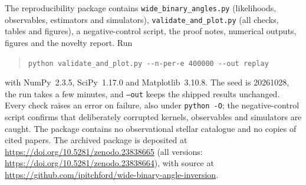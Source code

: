 \documentclass[11pt,a4paper]{article}
\theoremstyle{remark}\newtheorem{remark}[theorem]{Remark}
\begin{document}
The reproducibility package contains \texttt{wide\_binary\_angles.py} (likelihoods, observables, estimators and simulators), \texttt{validate\_and\_plot.py} (all checks, tables and figures), a negative-control script, the proof notes, numerical outputs, figures and the novelty report. Run
\begin{quote}
\verb|python validate_and_plot.py --n-per-e 400000 --out replay|
\end{quote}
with NumPy~2.3.5, SciPy~1.17.0 and Matplotlib~3.10.8. The seed is 20261028, the run takes a few minutes, and \texttt{--out} keeps the shipped results unchanged. Every check raises an error on failure, also under \texttt{python -O}; the negative-control script confirms that deliberately corrupted kernels, observables and simulators are caught. The package contains no observational stellar catalogue and no copies of cited papers. The archived package is deposited at \url{https://doi.org/10.5281/zenodo.23838665} (all versions: \url{https://doi.org/10.5281/zenodo.23838664}), with source at \url{https://github.com/ipitchford/wide-binary-angle-inversion}.
\end{document}
